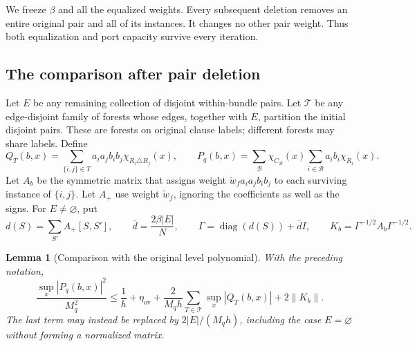 \documentclass[letterpaper,11pt]{article}
\newtheorem{lemma}[theorem]{Lemma}
\theoremstyle{definition}
\begin{document}
We freeze $\beta$ and all the equalized weights.  Every subsequent deletion
removes an entire original pair and all of its instances.  It changes no
other pair weight.  Thus both equalization and port capacity survive every
iteration.

\subsection{The comparison after pair deletion}

Let $E$ be any remaining collection of disjoint within-bundle pairs.  Let
$\mathcal T$ be any edge-disjoint family of forests whose edges, together
with $E$, partition the initial disjoint pairs.  These are forests on
original clause labels; different forests may share labels.  Define
\[
 Q_T(b,x)=\sum_{\{i,j\}\in T}a_i a_jb_i b_j
                         \chi_{R_i\triangle R_j}(x),
 \qquad
 P_q(b,x)=\sum_{\mathcal B}\chi_{C_{\mathcal B}}(x)
                       \sum_{i\in\mathcal B}a_i b_i\chi_{R_i}(x).
\]
Let $A_b$ be the symmetric matrix that assigns weight
$\widetilde w_f a_i a_jb_i b_j$ to each surviving instance of $\{i,j\}$.
Let $A_+$ use weight $\widetilde w_f$, ignoring the coefficients as well
as the signs.  For $E\ne\varnothing$, put
\begin{equation}\label{odd:eq:normalization}
 d(S)=\sum_{S'}A_+[S,S'],\qquad
 \overline d=\frac{2\beta|E|}{N},\qquad
 \Gamma=\operatorname{diag}(d(S))+\overline d I,\qquad
 K_b=\Gamma^{-1/2}A_b\Gamma^{-1/2}.
\end{equation}

\begin{lemma}[Comparison with the original level polynomial]
\label{odd:lem:comparison}
With the preceding notation,
\begin{equation}\label{odd:eq:comparison}
 \frac{\sup_x|P_q(b,x)|^2}{M_q^2}
 \leq\frac1h+\eta_{\mathrm{ov}}
   +\frac{2}{M_qh}\sum_{T\in\mathcal T}\sup_x|Q_T(b,x)|
   +2\|K_b\|.
\end{equation}
The last term may instead be replaced by $2|E|/(M_qh)$, including the
case $E=\varnothing$ without forming a normalized matrix.
\end{lemma}
\end{document}
